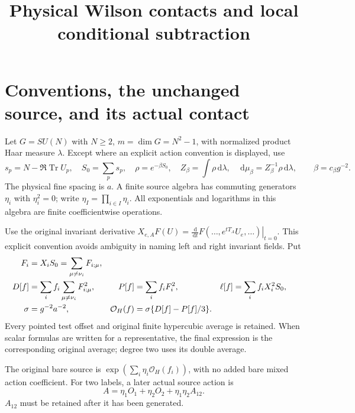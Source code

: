 \documentclass[11pt,letterpaper]{article}
\title{Physical Wilson contacts and local conditional subtraction}\author{}\date{}
\theoremstyle{plain}
\theoremstyle{remark}\newtheorem{remark}[theorem]{Scope}
\DeclareMathOperator{\Tr}{Tr}\DeclareMathOperator{\Vol}{Vol}
\newcommand{\dd}{\,\mathrm d}\newcommand{\OH}{\mathcal O_H}
\begin{document}
\maketitle
\section{Conventions, the unchanged source, and its actual contact}
\label{sec:conventions}

Let $G=SU(N)$ with $N\ge2$, $m=\dim G=N^2-1$, with normalized product Haar measure
$\lambda$. Except where an explicit action convention is displayed, use
\begin{equation}
s_p=N-\Re\Tr U_p,\quad S_0=\sum_p s_p,\quad
\rho=e^{-\beta S_0},\quad Z_\beta=\int\rho\dd\lambda,\quad
\dd\mu_\beta=Z_\beta^{-1}\rho\dd\lambda,
\qquad\beta=c_\beta g^{-2}.
\label{eq:Wilson}
\end{equation}
The physical fine spacing is $a$. A finite source algebra has commuting generators
$\eta_i$ with $\eta_i^2=0$; write $\eta_I=\prod_{i\in I}\eta_i$.
All exponentials and logarithms in this algebra are finite coefficientwise operations.

Use the original invariant derivative
$X_{e,A}F(U)=\left.\frac{\dd}{\dd t}F(\ldots,e^{tT_A}U_e,\ldots)\right|_{t=0}$.
This explicit convention avoids ambiguity in naming left and right invariant fields.
Put
\begin{align}
F_i&=X_iS_0=\sum_{\mu\ne\nu_i}F_{i;\mu},\notag\\
D[f]&=\sum_i f_i\sum_{\mu\ne\nu_i}F_{i;\mu}^2,
&P[f]&=\sum_i f_iF_i^2,
&\ell[f]&=\sum_i f_iX_i^2S_0,\notag\\
\sigma&=g^{-2}a^{-2},
&\OH(f)&=\sigma\{D[f]-P[f]/3\}.
\label{eq:H}
\end{align}
Every pointed test offset and original finite hypercubic average is retained.
When scalar formulas are written for a representative, the final expression is
the corresponding original average; degree two uses its double average.

The original bare source is $\exp(\sum_i\eta_i\OH(f_i))$, with no added bare
mixed action coefficient. For two labels, a later actual source action is
\begin{equation}
A=\eta_1O_1+\eta_2O_2+\eta_1\eta_2A_{12}.
\label{eq:source}
\end{equation}
$A_{12}$ must be retained after it has been generated.
\end{document}
